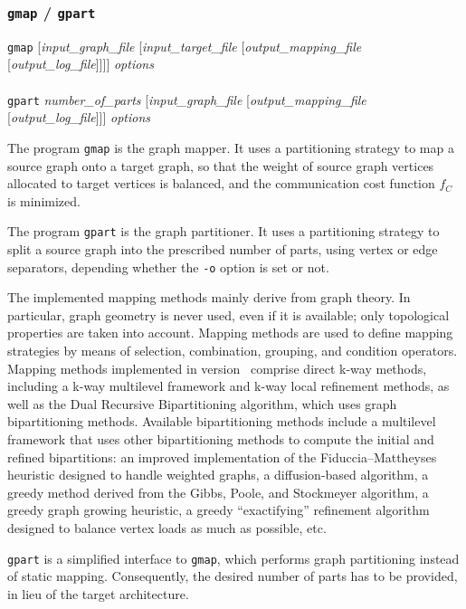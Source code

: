 \subsubsection{\texttt{gmap} / \texttt{gpart}}
\label{sec-prog-gmap}

\begin{itemize}
\progsyn
\texttt{gmap} [{\it input\_graph\_file} [{\it input\_target\_file} [{\it output\_mapping\_file} [{\it output\_log\_file}]]]] {\it options}\\
~\\
\texttt{gpart} {\it number\_\lbt of\_\lbt parts} [{\it input\_graph\_file} [{\it output\_mapping\_file} [{\it output\_log\_file}]]] {\it options}

\progdes
The program \texttt{gmap} is the graph mapper. It uses a partitioning
strategy to map a source graph onto a target graph, so that the weight of
source graph vertices allocated to target vertices is balanced, and the
communication cost function $f_C$ is minimized.

The program \texttt{gpart} is the graph partitioner. It uses a
partitioning strategy to split a source graph into the prescribed
number of parts, using vertex or edge separators, depending whether
the \texttt{-o} option is set or not.

The implemented mapping methods mainly derive from graph theory.  In
particular, graph geometry is never used, even if it is available;
only topological properties are taken into account. Mapping methods
are used to define mapping strategies by means of selection,
combination, grouping, and condition operators.
\\

Mapping methods implemented in version~{} comprise direct k-way
methods, including a k-way multilevel framework and k-way local
refinement methods, as well as the Dual
Recursive Bipartitioning algorithm, which uses graph bipartitioning
methods. Available bipartitioning methods include a multilevel
framework that uses other bipartitioning methods to compute the
initial and refined bipartitions: an improved implementation of the
Fiduccia--Mattheyses heuristic designed to handle weighted graphs,
a diffusion-based algorithm, a greedy method derived from the Gibbs,
Poole, and Stockmeyer algorithm, a greedy graph growing heuristic, a
greedy ``exactifying'' refinement algorithm designed to balance vertex
loads as much as possible, etc.

\texttt{gpart} is a simplified interface to \texttt{gmap}, which performs
graph partitioning instead of static mapping. Consequently, the
desired number of parts has to be provided, in lieu of the target
architecture.


\end{itemize}
